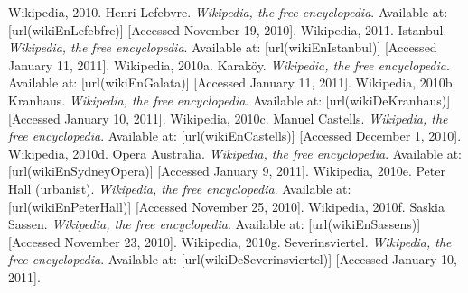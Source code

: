 {%
Wikipedia, 2010. Henri Lefebvre. {\em Wikipedia, the free encyclopedia}. Available at:  [url(wikiEnLefebfre)] [Accessed November 19, 2010]. \nl%
%
Wikipedia, 2011. Istanbul. {\em Wikipedia, the free encyclopedia}. Available at:  [url(wikiEnIstanbul)] [Accessed January 11, 2011]. \nl%
%
Wikipedia, 2010a. Karaköy. {\em Wikipedia, the free encyclopedia}. Available at:  [url(wikiEnGalata)] [Accessed January 11, 2011]. \nl%
%
Wikipedia, 2010b. Kranhaus. {\em Wikipedia, the free encyclopedia}. Available at:  [url(wikiDeKranhaus)] [Accessed January 10, 2011]. \nl%
%
Wikipedia, 2010c. Manuel Castells. {\em Wikipedia, the free encyclopedia}. Available at:  [url(wikiEnCastells)] [Accessed December 1, 2010]. \nl%
%
Wikipedia, 2010d. Opera Australia. {\em Wikipedia, the free encyclopedia}. Available at:  [url(wikiEnSydneyOpera)] [Accessed January 9, 2011]. \nl%
%
Wikipedia, 2010e. Peter Hall (urbanist). {\em Wikipedia, the free encyclopedia}. Available at:  [url(wikiEnPeterHall)] [Accessed November 25, 2010]. \nl%
%
Wikipedia, 2010f. Saskia Sassen. {\em Wikipedia, the free encyclopedia}. Available at:  [url(wikiEnSassens)] [Accessed November 23, 2010]. \nl%
%
Wikipedia, 2010g. Severinsviertel. {\em Wikipedia, the free encyclopedia}. Available at:  [url(wikiDeSeverinsviertel)] [Accessed January 10, 2011]. \nl%
\stopREF%
}

